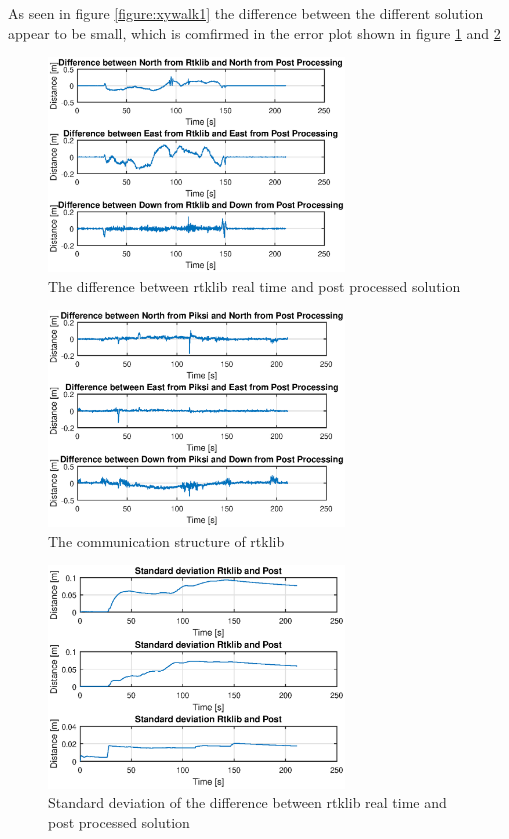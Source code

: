 As seen in figure \ref{figure:xywalk1} the difference between the different solution appear to be small, which is comfirmed in the error plot shown in figure \ref{figure:errorRTKwalk1} and \ref{figure:errorPiksiwalk1}
\begin{figure}[H]
	\centering
		\includegraphics[width=0.7\textwidth]{figs/plots/ertkpost.eps}
		\caption{The difference between rtklib real time and post processed solution}
		\label{figure:errorRTKwalk1}
\end{figure}
\begin{figure}[H]
	\centering
		\includegraphics[width=0.7\textwidth]{figs/plots/epiksiport.eps}
		\caption{The communication structure of rtklib}
		\label{figure:errorPiksiwalk1}
\end{figure}
\begin{figure}[H]
	\centering
		\includegraphics[width=0.7\textwidth]{figs/plots/stdrtkpost.eps}
		\caption{Standard deviation of the difference between rtklib real time and post processed solution}
		\label{figure:RTKLIB_STRUCTURE}
\end{figure}

